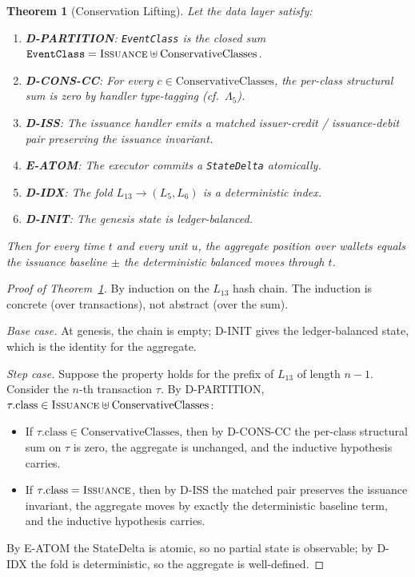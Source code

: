 \documentclass[11pt,a4paper]{article}
\newtheorem{theorem}[definition]{Theorem}
\begin{document}
\begin{theorem}[Conservation Lifting]
\label{thm:conservation}
Let the data layer satisfy:
\begin{enumerate}[nosep]
\item \textbf{D-PARTITION}: \texttt{EventClass} is the closed sum $\texttt{EventClass} = \textsc{Issuance} \uplus \text{ConservativeClasses}$.
\item \textbf{D-CONS-CC}: For every $c \in \text{ConservativeClasses}$, the per-class structural sum is zero by handler type-tagging (cf.~$\Lambda_5$).
\item \textbf{D-ISS}: The issuance handler emits a matched issuer-credit / issuance-debit pair preserving the issuance invariant.
\item \textbf{E-ATOM}: The executor commits a \texttt{StateDelta} atomically.
\item \textbf{D-IDX}: The fold $L_{13} \to (L_5, L_6)$ is a deterministic index.
\item \textbf{D-INIT}: The genesis state is ledger-balanced.
\end{enumerate}
Then for every time $t$ and every unit $u$, the aggregate position over wallets equals the issuance baseline $\pm$ the deterministic balanced moves through $t$.
\end{theorem}

\begin{proof}[Proof of Theorem~\ref{thm:conservation}]
By induction on the $L_{13}$ hash chain. The induction is concrete (over transactions), not abstract (over the sum).

\emph{Base case.} At genesis, the chain is empty; D-INIT gives the ledger-balanced state, which is the identity for the aggregate.

\emph{Step case.} Suppose the property holds for the prefix of $L_{13}$ of length $n-1$. Consider the $n$-th transaction $\tau$. By D-PARTITION, $\tau.\text{class} \in \textsc{Issuance} \uplus \text{ConservativeClasses}$:
\begin{itemize}[nosep]
\item If $\tau.\text{class} \in \text{ConservativeClasses}$, then by D-CONS-CC the per-class structural sum on $\tau$ is zero, the aggregate is unchanged, and the inductive hypothesis carries.
\item If $\tau.\text{class} = \textsc{Issuance}$, then by D-ISS the matched pair preserves the issuance invariant, the aggregate moves by exactly the deterministic baseline term, and the inductive hypothesis carries.
\end{itemize}
By E-ATOM the StateDelta is atomic, so no partial state is observable; by D-IDX the fold is deterministic, so the aggregate is well-defined. \qedhere
\end{proof}
\end{document}
